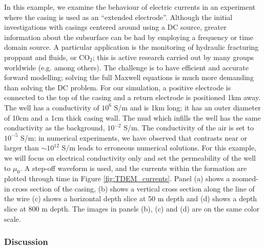 In this example, we examine the behaviour of electric currents in an experiment where the casing is used as an ``extended electrode''. Although the initial investigations with casings centered around using a DC source, greater information about the subsurface can be had by employing a frequency or time domain source. A particular application is the monitoring of hydraulic fracturing proppant and fluids, or CO$_2$; this is active research carried out by many groups worldwide (e.g. \cite{Hoversten2015, Um2015, Puzyrev2017, Zhang2018} among others). The challenge is to have efficient and accurate forward modelling; solving the full Maxwell equations is much more demanding than solving the DC problem. For our simulation, a positive electrode is connected to the top of the casing and a return electrode is positioned 1km away. The well has a conductivity of $10^6$ S/m and is 1km long; it has an outer diameter of 10cm and a 1cm thick casing wall. The mud which infills the well has the same conductivity as the background, $10^{-2}$ S/m. The conductivity of the air is set to $10^{-5}$ S/m; in numerical experiments, we have observed that contrasts near or larger than $\sim 10^{12}$ S/m leads to erroneous numerical solutions. For this example, we will focus on electrical conductivity only and set the permeability of the well to $\mu_0$. A step-off waveform is used, and the currents within the formation are plotted through time in Figure \ref{fig:TDEM_currents}. Panel (a) shows a zoomed-in cross section of the casing, (b) shows a vertical cross section along the line of the wire (c) shows a horizontal depth slice at 50 m depth and (d) shows a depth slice at 800 m depth. The images in panels (b), (c) and (d) are on the same color scale.

\subsubsection{Discussion}

